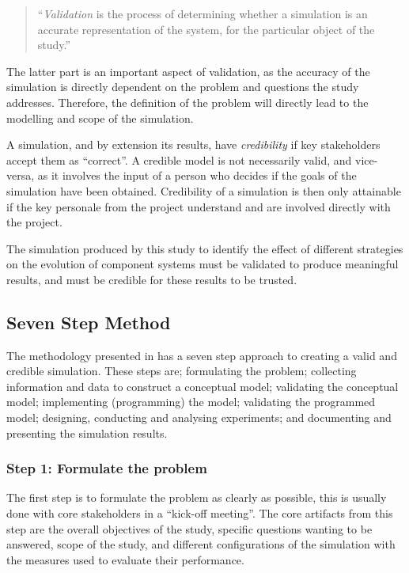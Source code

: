 \begin{quotation}
``\textit{Validation} is the process of determining whether a simulation is an accurate representation of the system, for the particular object of the study.'' \citep{Law2005}
\end{quotation}

The latter part is an important aspect of validation, as the accuracy of the simulation is directly dependent on the problem and questions the study addresses.
Therefore, the definition of the problem will directly lead to the modelling and scope of the simulation.

A simulation, and by extension its results, have \textit{credibility} if key stakeholders accept them as ``correct''.
A credible model is not necessarily valid, and vice-versa, as it involves the input of a person who decides if the goals of the simulation have been obtained.
Credibility of a simulation is then only attainable if the key personale from the project understand and are involved directly with the project.

The simulation produced by this study to identify the effect of different strategies on the evolution of component systems must be validated to produce meaningful results,
and must be credible for these results to be trusted.

\subsection{Seven Step Method}
The methodology presented in \citep{Law2005} has a seven step approach to creating a valid and credible simulation.
These steps are; formulating the problem; collecting information and data to construct a conceptual model; validating the conceptual model;
implementing (programming) the model; validating the programmed model; designing, conducting and analysing experiments; and documenting and presenting the simulation results.

\subsubsection{Step 1: Formulate the problem}
The first step is to formulate the problem as clearly as possible, this is usually done with core stakeholders in a ``kick-off meeting''.
The core artifacts from this step are the overall objectives of the study, specific questions wanting to be answered, scope of the study,
 and different configurations of the simulation with the measures used to evaluate their performance. 

